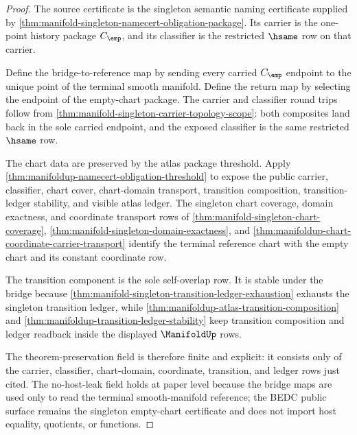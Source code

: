 \begin{proof}
The source certificate is the singleton semantic naming certificate supplied
by \autoref{thm:manifold-singleton-namecert-obligation-package}. Its carrier is
the one-point history package $C_{\emp}$, and its classifier is the restricted
$\hsame$ row on that carrier.

Define the bridge-to-reference map by sending every carried $C_{\emp}$ endpoint
to the unique point of the terminal smooth manifold. Define the return map by
selecting the endpoint of the empty-chart package. The carrier and classifier
round trips follow from
\autoref{thm:manifold-singleton-carrier-topology-scope}: both composites land
back in the sole carried endpoint, and the exposed classifier is the same
restricted $\hsame$ row.

The chart data are preserved by the atlas package threshold. Apply
\autoref{thm:manifoldup-namecert-obligation-threshold} to expose the public
carrier, classifier, chart cover, chart-domain transport, transition
composition, transition-ledger stability, and visible atlas ledger. The
singleton chart coverage, domain exactness, and coordinate transport rows of
\autoref{thm:manifold-singleton-chart-coverage},
\autoref{thm:manifold-singleton-domain-exactness}, and
\autoref{thm:manifoldup-chart-coordinate-carrier-transport} identify the
terminal reference chart with the empty chart and its constant coordinate row.

The transition component is the sole self-overlap row. It is stable under the
bridge because \autoref{thm:manifold-singleton-transition-ledger-exhaustion}
exhausts the singleton transition ledger, while
\autoref{thm:manifoldup-atlas-transition-composition} and
\autoref{thm:manifoldup-transition-ledger-stability} keep transition
composition and ledger readback inside the displayed $\ManifoldUp$ rows.

The theorem-preservation field is therefore finite and explicit: it consists
only of the carrier, classifier, chart-domain, coordinate, transition, and
ledger rows just cited. The no-host-leak field holds at paper level because
the bridge maps are used only to read the terminal smooth-manifold reference;
the BEDC public surface remains the singleton empty-chart certificate and does
not import host equality, quotients, or functions.
\end{proof}


